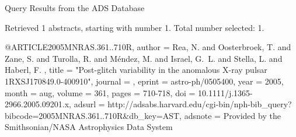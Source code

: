 Query Results from the ADS Database


Retrieved 1 abstracts, starting with number 1.  Total number selected: 1.

@ARTICLE{2005MNRAS.361..710R,
   author = {{Rea}, N. and {Oosterbroek}, T. and {Zane}, S. and {Turolla}, R. and 
	{M{\'e}ndez}, M. and {Israel}, G.~L. and {Stella}, L. and {Haberl}, F.
	},
    title = "{Post-glitch variability in the anomalous X-ray pulsar 1RXSJ170849.0-400910}",
  journal = {\mnras},
   eprint = {astro-ph/0505400},
     year = 2005,
    month = aug,
   volume = 361,
    pages = {710-718},
      doi = {10.1111/j.1365-2966.2005.09201.x},
   adsurl = {http://adsabs.harvard.edu/cgi-bin/nph-bib_query?bibcode=2005MNRAS.361..710R&db_key=AST},
  adsnote = {Provided by the Smithsonian/NASA Astrophysics Data System}
}


